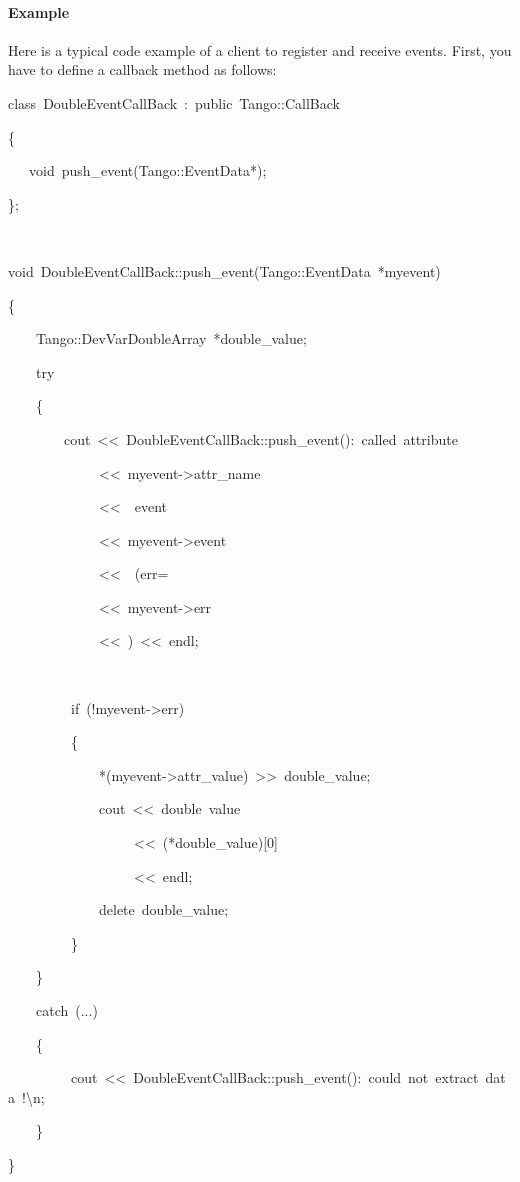 \paragraph{Example}

Here is a typical code example of a client to register and receive
events. First, you have to define a callback method
as follows:


\begin{lyxcode}
class~DoubleEventCallBack~:~public~Tango::CallBack~

\{

~~~void~push\_event(Tango::EventData{*});

\};~

~

void~DoubleEventCallBack::push\_event(Tango::EventData~{*}myevent)

\{

~~~~Tango::DevVarDoubleArray~{*}double\_value;

~~~~try

~~~~\{

~~~~~~~~cout~<\textcompwordmark{}<~\textquotedbl{}DoubleEventCallBack::push\_event():~called~attribute~\textquotedbl{}~

~~~~~~~~~~~~~<\textcompwordmark{}<~myevent->attr\_name

~~~~~~~~~~~~~<\textcompwordmark{}<~\textquotedbl{}~event~\textquotedbl{}

~~~~~~~~~~~~~<\textcompwordmark{}<~myevent->event~

~~~~~~~~~~~~~<\textcompwordmark{}<~\textquotedbl{}~(err=\textquotedbl{}

~~~~~~~~~~~~~<\textcompwordmark{}<~myevent->err

~~~~~~~~~~~~~<\textcompwordmark{}<~\textquotedbl{})\textquotedbl{}~<\textcompwordmark{}<~endl;

~

~~~~~~~~~if~(!myevent->err)

~~~~~~~~~\{

~~~~~~~~~~~~~{*}(myevent->attr\_value)~>\textcompwordmark{}>~double\_value;

~~~~~~~~~~~~~cout~<\textcompwordmark{}<~\textquotedbl{}double~value~\textquotedbl{}

~~~~~~~~~~~~~~~~~~<\textcompwordmark{}<~({*}double\_value){[}0{]}

~~~~~~~~~~~~~~~~~~<\textcompwordmark{}<~endl;

~~~~~~~~~~~~~delete~double\_value;

~~~~~~~~~\}

~~~~\}

~~~~catch~(...)

~~~~\{

~~~~~~~~~cout~<\textcompwordmark{}<~\textquotedbl{}DoubleEventCallBack::push\_event():~could~not~extract~data~!\textbackslash{}n\textquotedbl{};

~~~~\}

\}
\end{lyxcode}


